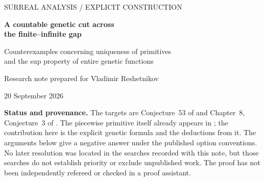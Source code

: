 \documentclass[11pt,letterpaper]{article}
\numberwithin{equation}{section}
\theoremstyle{definition}
\theoremstyle{remark}
\newcommand{\No}{\mathbf{No}}
\newcommand{\N}{\mathbb{N}}
\newcommand{\cut}[2]{\left\{\,#1\;\middle|\;#2\,\right\}}
\begin{document}
\thispagestyle{empty}
\begin{center}
{\small\sffamily\color{oliveink} SURREAL ANALYSIS \quad / \quad EXPLICIT CONSTRUCTION}\par
\vspace{0.75cm}
{\LARGE\bfseries A countable genetic cut across\\[0.12em] the finite--infinite gap}\par
\vspace{0.4cm}
{\large Counterexamples concerning uniqueness of primitives\\
and the sup property of entire genetic functions}\par
\vspace{0.5cm}
{\normalsize Research note prepared for Vladimir Reshetnikov}\par
\vspace{0.15cm}
{\small 20 September 2026}
\end{center}
\vspace{0.35cm}
\begin{abstract}
Put $q(t)=t/(1+t^2)$ and form the countable Conway cut
\[
 T(x)=\cut{q(n-x):n\in\N}{},\qquad B(x)=1-T(x).
\]
We prove that $B$ is the indicator of the positive infinite surreal numbers.
The option functions are globally defined rational functions, so this is an
admissible genetic construction under the set-sized option rules in
Rubinstein-Salzedo--Swaminathan and in Berenbeim's later formulation; the
latter's global cofinality requirement is checked directly. Yet $B$ is locally
constant everywhere and nonconstant globally. Consequently $x$ and $x-B(x)$
are genetic primitives of $1$ that agree on every real argument but do not
differ by a constant. The second is an increasing bijection of $\No$.
A bounded sublevel class of $B$ has no surreal supremum, giving a second
counterexample. We extend the construction to arbitrary nonempty sets of
surreals without a largest element, construct ordinal-indexed independent
families in the kernel of pointwise differentiation, and explain precisely
why real-variable uniqueness arguments do not apply. The accompanying
standard-library Python program performs exact finite checks, not a formal
verification of the infinitary proofs.
\end{abstract}
\begin{resultbox}
\textbf{Status and provenance.}
The targets are Conjecture~53 of \cite{RSS} and Chapter~8,
Conjecture~3 of \cite{Berenbeim}. The piecewise primitive itself already
appears in \cite{RSS}; the contribution here is the explicit genetic formula
and the deductions from it. The arguments below give a negative answer
under the published option conventions. No later resolution was located in
the searches recorded with this note, but those searches do not establish
priority or exclude unpublished work. The proof has not been independently
refereed or checked in a proof assistant.
\end{resultbox}
\end{document}
